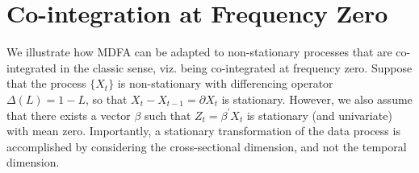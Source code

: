 \documentclass[a4paper]{book}
\begin{document}
\section{Co-integration at Frequency Zero} 
 \label{sec:coint-zero}

We illustrate how MDFA can be adapted to non-stationary processes that are co-integrated
in the classic sense, viz. being co-integrated at frequency zero.  
 Suppose that the process $\{ X_t \}$ is non-stationary with differencing operator
  $\Delta (L) = 1 - L$, so that $X_t- X_{t-1} = \partial X_t$ is stationary.  However,
  we also assume that there exists a vector $\beta$ such that
  $Z_t = \beta^{\prime} X_t$ is stationary (and univariate) with mean zero.
  Importantly, a stationary transformation of
   the data process is accomplished by considering the cross-sectional dimension, and not
   the temporal dimension.  
   
\end{document}

